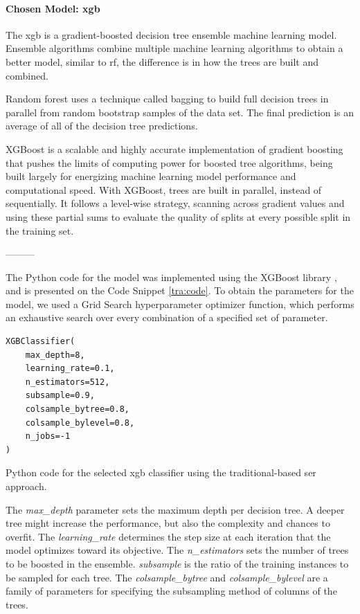 \paragraph{Chosen Model: \ac{xgb}}

The \ac{xgb} is a gradient-boosted decision tree ensemble machine learning model. Ensemble algorithms combine multiple machine learning algorithms to obtain a better model, similar to \ac{rf}, the difference is in how the trees are built and combined.

Random forest uses a technique called bagging to build full decision trees in parallel from random bootstrap samples of the data set. The final prediction is an average of all of the decision tree predictions.

XGBoost is a scalable and highly accurate implementation of gradient boosting that pushes the limits of computing power for boosted tree algorithms, being built largely for energizing machine learning model performance and computational speed. With XGBoost, trees are built in parallel, instead of sequentially. It follows a level-wise strategy, scanning across gradient values and using these partial sums to evaluate the quality of splits at every possible split in the training set. 

---------

The Python code for the model was implemented using the XGBoost library \cite{xgboostchen}, and is presented on the Code Snippet \ref{tra:code}. To obtain the parameters for the model, we used a Grid Search hyperparameter optimizer function, which performs an exhaustive search over every combination of a specified set of parameter.


\begin{listing}[H]
	\begin{verbatim}
XGBClassifier(
	max_depth=8,
	learning_rate=0.1,
	n_estimators=512,
	subsample=0.9,
	colsample_bytree=0.8,
	colsample_bylevel=0.8,
	n_jobs=-1
)
	\end{verbatim}
	\caption{Python code for the selected \ac{xgb} classifier using the traditional-based \ac{ser} approach.}
	\label{tra:code}
\end{listing}


The \textit{max\_depth} parameter sets the maximum depth per decision tree. A deeper tree might increase the performance, but also the complexity and chances to overfit. The \textit{learning\_rate} determines the step size at each iteration that the model optimizes toward its objective. The \textit{n\_estimators} sets the number of trees to be boosted in the ensemble. \textit{subsample} is the ratio of the training instances to be sampled for each tree. The \textit{colsample\_bytree} and \textit{colsample\_bylevel} are a family of parameters for specifying the subsampling method of columns of the trees.

